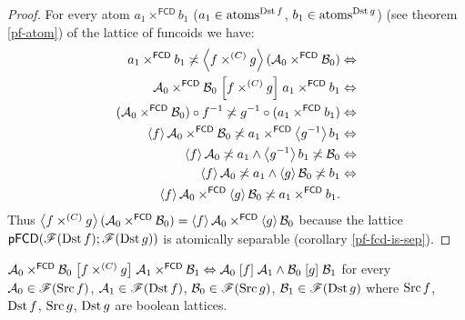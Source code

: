 \begin{proof}
For every atom $a_{1}\times^{\mathsf{FCD}}b_{1}$ ($a_{1}\in\operatorname{atoms}^{\operatorname{Dst} f}$,
$b_{1}\in\operatorname{atoms}^{\operatorname{Dst} g}$) (see theorem \ref{pf-atom}) of the lattice
of funcoids we have:
\begin{align*}
a_{1}\times^{\mathsf{FCD}}b_{1}\not\asymp\left\langle f\times^{(C)}g\right\rangle(\mathcal{A}_{0}\times^{\mathsf{FCD}}\mathcal{B}_{0}) & \Leftrightarrow\\
\mathcal{A}_{0}\times^{\mathsf{FCD}}\mathcal{B}_{0}\mathrel{\left[f\times^{(C)}g\right]}a_{1}\times^{\mathsf{FCD}}b_{1} & \Leftrightarrow\\
(\mathcal{A}_{0}\times^{\mathsf{FCD}}\mathcal{B}_{0})\circ f^{-1}\not\asymp g^{-1}\circ(a_{1}\times^{\mathsf{FCD}}b_{1}) & \Leftrightarrow\\
\left\langle f\right\rangle\mathcal{A}_{0}\times^{\mathsf{FCD}}\mathcal{B}_{0}\not\asymp a_{1}\times^{\mathsf{FCD}}\left\langle g^{-1}\right\rangle b_{1} & \Leftrightarrow\\
\left\langle f\right\rangle\mathcal{A}_{0}\not\asymp a_{1}\land\left\langle g^{-1}\right\rangle b_{1}\not\asymp\mathcal{B}_{0} & \Leftrightarrow\\
\left\langle f\right\rangle\mathcal{A}_{0}\not\asymp a_{1}\land\left\langle g\right\rangle\mathcal{B}_{0}\not\asymp b_{1} & \Leftrightarrow\\
\left\langle f\right\rangle\mathcal{A}_{0}\times^{\mathsf{FCD}}\left\langle g\right\rangle\mathcal{B}_{0}\not\asymp a_{1}\times^{\mathsf{FCD}}b_{1}.
\end{align*}
Thus $\left\langle f\times^{(C)}g\right\rangle(\mathcal{A}_{0}\times^{\mathsf{FCD}}\mathcal{B}_{0})=\left\langle f\right\rangle\mathcal{A}_{0}\times^{\mathsf{FCD}}\left\langle g\right\rangle\mathcal{B}_{0}$
because the lattice $\mathsf{pFCD}(\mathscr{F}(\operatorname{Dst} f);\mathscr{F}(\operatorname{Dst} g))$
is atomically separable (corollary \ref{pf-fcd-is-sep}).\end{proof}
\begin{cor}\label{cc-over-fcd}
$\mathcal{A}_{0}\times^{\mathsf{FCD}}\mathcal{B}_{0}\mathrel{\left[f\times^{(C)}g\right]}\mathcal{A}_{1}\times^{\mathsf{FCD}}\mathcal{B}_{1}\Leftrightarrow\mathcal{A}_{0}\mathrel{\left[f\right]}\mathcal{A}_{1}\wedge\mathcal{B}_{0}\mathrel{\left[g\right]}\mathcal{B}_{1}$
for every $\mathcal{A}_{0}\in\mathscr{F}(\operatorname{Src} f)$, $\mathcal{A}_{1}\in\mathscr{F}(\operatorname{Dst} f)$,
$\mathcal{B}_{0}\in\mathscr{F}(\operatorname{Src} g)$, $\mathcal{B}_{1}\in\mathscr{F}(\operatorname{Dst} g)$
where $\operatorname{Src} f$, $\operatorname{Dst} f$, $\operatorname{Src} g$, $\operatorname{Dst} g$ are boolean lattices.\end{cor}
